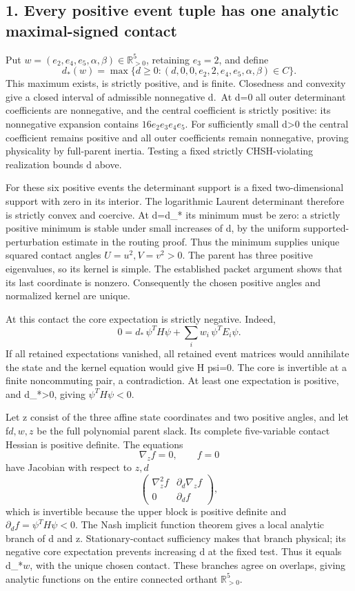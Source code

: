 \hypertarget{every-positive-event-tuple-has-one-analytic-maximal-signed-contact}{%
\subsection{1. Every positive event tuple has one analytic maximal-signed contact}\label{pe31b9ef5ec43:every-positive-event-tuple-has-one-analytic-maximal-signed-contact}}

Put \(w=(e_2,e_4,e_5,\alpha,\beta)\in\mathbb R_{>0}^5\), retaining
\(e_3=2\), and define
\[
d_*(w)=\max\{d\ge0:(d,0,0,e_2,2,e_4,e_5,\alpha,\beta)\in C\}.
\tag{2}
\]
This maximum exists, is strictly positive, and is finite. Closedness and
convexity give a closed interval of admissible nonnegative d.~At d=0 all
outer determinant coefficients are nonnegative, and the central coefficient
is strictly positive: its nonnegative expansion contains
\(16e_2e_3e_4e_5\). For sufficiently small d\textgreater0 the central coefficient
remains positive and all outer coefficients remain nonnegative, proving
physicality by full-parent inertia. Testing a fixed strictly CHSH-violating
realization bounds d above.

For these six positive events the determinant support is a fixed
two-dimensional support with zero in its interior. The logarithmic Laurent
determinant therefore is strictly convex and coercive. At d=d\_* its minimum
must be zero: a strictly positive minimum is stable under small increases
of d, by the uniform supported-perturbation estimate in the routing proof.
Thus the minimum supplies unique squared contact angles \(U=u^2,V=v^2>0\).
The parent has three positive eigenvalues, so its kernel is simple. The
established packet argument shows that its last coordinate is nonzero.
Consequently the chosen positive angles and normalized kernel are unique.

At this contact the core expectation is strictly negative. Indeed,
\[
0=d_*\,\psi^TH\psi+\sum_i w_i\,\psi^TE_i\psi.
\]
If all retained expectations vanished, all retained event matrices would
annihilate the state and the kernel equation would give H psi=0. The core
is invertible at a finite noncommuting pair, a contradiction. At least one
expectation is positive, and d\_*\textgreater0, giving \(\psi^TH\psi<0\).

Let z consist of the three affine state coordinates and two positive
angles, and let f\(d,w,z\) be the full polynomial parent slack. Its complete
five-variable contact Hessian is positive definite. The equations
\[
\nabla_z f=0,\qquad f=0
\]
have Jacobian with respect to \(z,d\)
\[
\begin{pmatrix} \nabla_z^2 f&\partial_d\nabla_z f\\
0&\partial_d f\end{pmatrix},
\]
which is invertible because the upper block is positive definite and
\(\partial_d f=\psi^TH\psi<0\). The Nash implicit function theorem gives
a local analytic branch of d and z. Stationary-contact sufficiency makes
that branch physical; its negative core expectation prevents increasing d
at the fixed test. Thus it equals d\_*\(w\), with the unique chosen contact.
These branches agree on overlaps, giving analytic functions on the entire
connected orthant \(\mathbb R_{>0}^5\).

